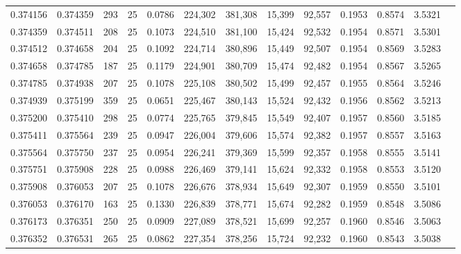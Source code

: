 \begin{tabular}{rrrrrrrrrrrrr}
0.374156 & 0.374359 &   293 &  25 &                                     0.0786 & 224,302 & 381,308 &  15,399 &  92,557 & 0.1953 & 0.8574 & 3.5321 \\
0.374359 & 0.374511 &   208 &  25 &                                     0.1073 & 224,510 & 381,100 &  15,424 &  92,532 & 0.1954 & 0.8571 & 3.5301 \\
0.374512 & 0.374658 &   204 &  25 &                                     0.1092 & 224,714 & 380,896 &  15,449 &  92,507 & 0.1954 & 0.8569 & 3.5283 \\
0.374658 & 0.374785 &   187 &  25 &                                     0.1179 & 224,901 & 380,709 &  15,474 &  92,482 & 0.1954 & 0.8567 & 3.5265 \\
0.374785 & 0.374938 &   207 &  25 &                                     0.1078 & 225,108 & 380,502 &  15,499 &  92,457 & 0.1955 & 0.8564 & 3.5246 \\
0.374939 & 0.375199 &   359 &  25 &                                     0.0651 & 225,467 & 380,143 &  15,524 &  92,432 & 0.1956 & 0.8562 & 3.5213 \\
0.375200 & 0.375410 &   298 &  25 &                                     0.0774 & 225,765 & 379,845 &  15,549 &  92,407 & 0.1957 & 0.8560 & 3.5185 \\
0.375411 & 0.375564 &   239 &  25 &                                     0.0947 & 226,004 & 379,606 &  15,574 &  92,382 & 0.1957 & 0.8557 & 3.5163 \\
0.375564 & 0.375750 &   237 &  25 &                                     0.0954 & 226,241 & 379,369 &  15,599 &  92,357 & 0.1958 & 0.8555 & 3.5141 \\
0.375751 & 0.375908 &   228 &  25 &                                     0.0988 & 226,469 & 379,141 &  15,624 &  92,332 & 0.1958 & 0.8553 & 3.5120 \\
0.375908 & 0.376053 &   207 &  25 &                                     0.1078 & 226,676 & 378,934 &  15,649 &  92,307 & 0.1959 & 0.8550 & 3.5101 \\
0.376053 & 0.376170 &   163 &  25 &                                     0.1330 & 226,839 & 378,771 &  15,674 &  92,282 & 0.1959 & 0.8548 & 3.5086 \\
0.376173 & 0.376351 &   250 &  25 &                                     0.0909 & 227,089 & 378,521 &  15,699 &  92,257 & 0.1960 & 0.8546 & 3.5063 \\
0.376352 & 0.376531 &   265 &  25 &                                     0.0862 & 227,354 & 378,256 &  15,724 &  92,232 & 0.1960 & 0.8543 & 3.5038 \\

\end{tabular}
